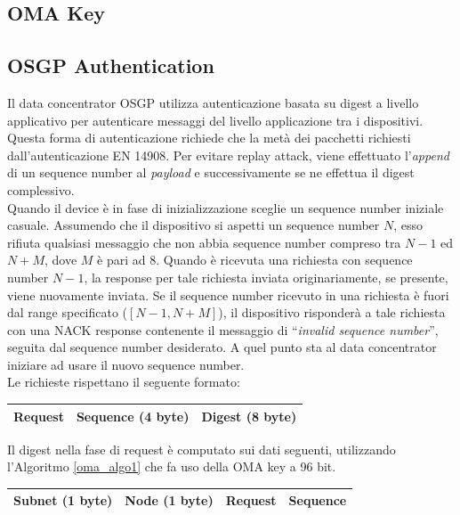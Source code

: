 \subsection{OMA Key}
\subsection{OSGP Authentication}
Il data concentrator OSGP utilizza autenticazione basata su digest a livello applicativo per autenticare messaggi del livello applicazione tra i dispositivi. Questa forma di autenticazione richiede che la metà dei pacchetti richiesti dall'autenticazione EN 14908. Per evitare replay attack, viene effettuato l'\emph{append} di un sequence number al \emph{payload} e successivamente se ne effettua il digest complessivo.\\
Quando il device è in fase di inizializzazione sceglie un sequence number iniziale casuale. Assumendo che il dispositivo si aspetti un sequence number $N$, esso rifiuta qualsiasi messaggio che non abbia sequence number compreso tra $N-1$ ed $N+M$, dove $M$ è pari ad 8. Quando è ricevuta una richiesta con sequence number $N-1$, la response per tale richiesta inviata originariamente, se presente, viene nuovamente inviata. Se il sequence number ricevuto in una richiesta è fuori dal range specificato ($[N-1, N+M]$), il dispositivo risponderà a tale richiesta con una NACK response contenente il messaggio di ``\emph{invalid sequence number}'', seguita dal sequence number desiderato. A quel punto sta al data concentrator iniziare ad usare il nuovo sequence number.\\
Le richieste rispettano il seguente formato:
\begin{table}[!h]
	\centering
	\begin{tabular}{|l|l|l|}
		\hline
		Request & Sequence (4 byte) & Digest (8 byte) \\ \hline
	\end{tabular}
\end{table}
\newline
Il digest nella fase di request è computato sui dati seguenti, utilizzando l'Algoritmo \ref{oma_algo1} che fa uso della OMA key a 96 bit.\\
\begin{table}[!h]
	\centering
	\begin{tabular}{|l|l|l|l|}
		\hline
		Subnet (1 byte) & Node (1 byte) & Request & Sequence\\ \hline
	\end{tabular}
\end{table}
